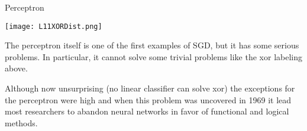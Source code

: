 \documentclass[10pt, table, dvipsnames,xcdraw, handout]{beamer}
\begin{document}
\begin{frame}[fragile]{Perceptron}
  \begin{minipage}[t][0.5\textheight][t]{\textwidth}
	\centering \texttt{[image: L11XORDist.png]} 
  \end{minipage}
  \vfill
\begin{minipage}[t][0.5\textheight][t]{\textwidth}
The perceptron itself is one of the first examples of SGD, but it has some serious problems. In particular, it cannot solve some trivial problems like the xor labeling above. \pause

Although now unsurprising (no linear classifier can solve xor) the exceptions for the perceptron were high and when this problem was uncovered in 1969 it lead most researchers to abandon neural networks in favor of functional and logical methods.  
\end{minipage}
\end{frame}
\end{document}
